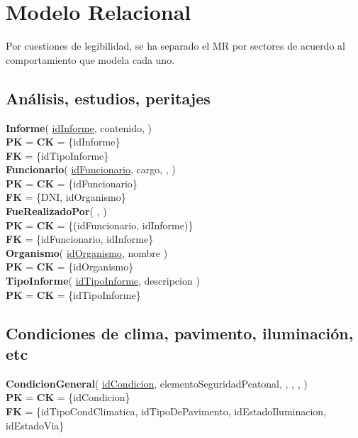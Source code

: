 \section{Modelo Relacional}
\small

Por cuestiones de legibilidad, se ha separado el MR por sectores de acuerdo
    al comportamiento que modela cada uno.

\subsection{Análisis, estudios, peritajes}

\textbf{Informe}(
    \uline{idInforme},
    contenido,
)\\
\textbf{PK} = \textbf{CK} = \{idInforme\}\\
\textbf{FK} = \{idTipoInforme\}\\

\textbf{Funcionario}(
    \uline{idFuncionario},
    cargo,
    ,
)\\
\textbf{PK} = \textbf{CK} = \{idFuncionario\}\\
\textbf{FK} = \{DNI, idOrganismo\}\\

\textbf{FueRealizadoPor}(
    ,
)\\
\textbf{PK} = \textbf{CK} = \{(idFuncionario, idInforme)\}\\
\textbf{FK} = \{idFuncionario, idInforme\}\\

\textbf{Organismo}(
    \uline{idOrganismo},
    nombre
)\\
\textbf{PK} = \textbf{CK} = \{idOrganismo\}\\

\textbf{TipoInforme}(
    \uline{idTipoInforme},
    descripcion
)\\
\textbf{PK} = \textbf{CK} = \{idTipoInforme\}\\


\subsection{Condiciones de clima, pavimento, iluminación, etc}

\textbf{CondicionGeneral}(
    \uline{idCondicion},
    elementoSeguridadPeatonal,
    ,
    ,
    ,
)\\
\textbf{PK} = \textbf{CK} = \{idCondicion\}\\
\textbf{FK} = \{idTipoCondClimatica, idTipoDePavimento, idEstadoIluminacion, idEstadoVia\}\\



